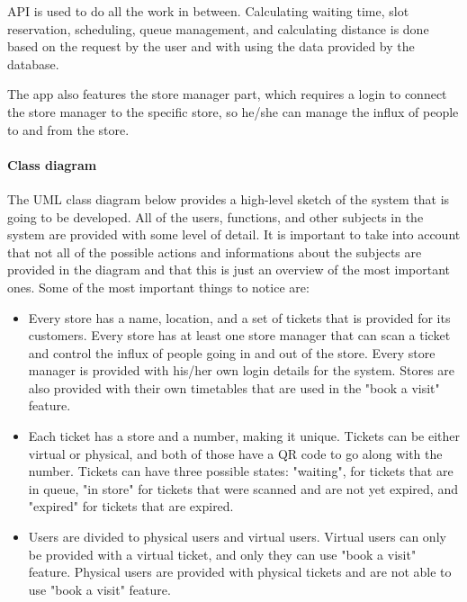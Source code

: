 API is used to do all the work in between. Calculating waiting time, slot reservation, scheduling, queue management, and calculating distance is done based on the request by the user and with using the data provided by the database. 

The app also features the store manager part, which requires a login to connect the store manager to the specific store, so he/she can manage the influx of people to and from the store.

\newpage
\paragraph{Class diagram}\hfill \break

The UML class diagram below provides a high-level sketch of the system that is going to be developed. All of the users, functions, and other subjects in the system are provided with some level of detail. It is important to take into account that not all of the possible actions and informations about the subjects are provided in the diagram and that this is just an overview of the most important ones.
Some of the most important things to notice are:
\begin{itemize}
\item Every store has a name, location, and a set of tickets that is provided for its customers. Every store has at least one store manager that can scan a ticket and control the influx of people going in and out of the store. Every store manager is provided with his/her own login details for the system. Stores are also provided with their own timetables that are used in the "book a visit" feature.
\item Each ticket has a store and a number, making it unique. Tickets can be either virtual or physical, and both of those have a QR code to go along with the number. Tickets can have three possible states: "waiting", for tickets that are in queue, "in store" for tickets that were scanned and are not yet expired, and "expired" for tickets that are expired. 
\item Users are divided to physical users and virtual users. Virtual users can only be provided with a virtual ticket, and only they can use "book a visit" feature. Physical users are provided with physical tickets and are not able to use "book a visit" feature.
\end{itemize}


